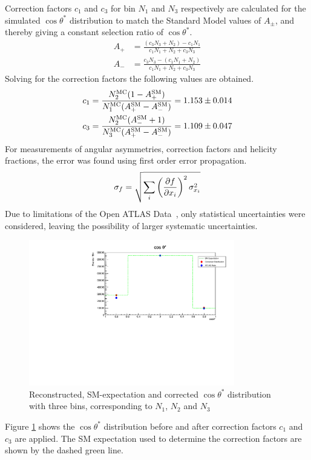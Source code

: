 \documentclass[12pt,a4paper]{article}
\numberwithin{equation}{section}
\begin{document}
Correction factors $c_1$ and $c_3$ for bin $N_1$ and $N_3$ respectively are
calculated for the simulated $\cos\theta^*$ distribution to match the Standard Model
values of $A_{\pm}$, and thereby giving a constant selection ratio of $\cos\theta^*$.
\newcommand{\MC}{\mathrm{MC}}
\newcommand{\SM}{\mathrm{SM}}
\begin{align}
	A_{+} &= \frac{(c_3N_3 + N_2) - c_1N_1}{c_1N_1 + N_2 + c_3N_3} \\
	A_{-} &= \frac{c_3N_3 - (c_1N_1 + N_2)}{c_1N_1 + N_2 + c_3N_3}
\end{align}
Solving for the correction factors the following values are obtained.
\begin{align} \label{eq:correction}
	c_1 &= \frac{N_2^{\MC}(1-A_{+}^{\SM})}{N_1^{\MC}(A_{+}^{\SM} -A_{-}^{\SM})} = \num{1.153 +- 0.014}  \\
	c_3 &= \frac{N_2^{\MC}(A_{-}^{\SM}+1)}{N_3^{\MC}(A_{+}^{\SM}-A_{-}^{\SM})} = \num{1.109 +- 0.047}
\end{align}
For measurements of angular asymmetries, correction factors and helicity
fractions, the error was found using first order error propagation.
\begin{align}
	\sigma_{f} = \sqrt{\sum_{i}\left(\pdv{f}{x_i}\right)^2\sigma_{x_i}^2}
\end{align}
Due to limitations of the Open ATLAS Data~\cite{oreach2020}, only statistical
uncertainties were considered, leaving the possibility of larger systematic
uncertainties.\\

\begin{figure}[H]
	\centering
	\includegraphics[width=0.8\textwidth]{figures/nhist.pdf}
	\caption{Reconstructed, SM-expectation and corrected $\cos\theta^{*}$ distribution with three bins, corresponding to $N_1$, $N_2$ and $N_3$}
	\label{fig:cos3bin}
\end{figure}
Figure \ref{fig:cos3bin} shows the $\cos\theta^{*}$ distribution before and after correction factors $c_1$ and $c_3$ are applied. The SM expectation used to determine the correction factors are shown by the dashed green line. \\
\end{document}
